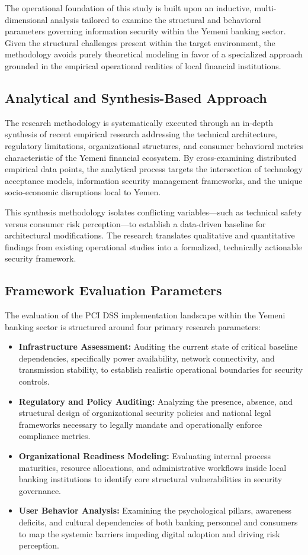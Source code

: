 \documentclass[12pt,a4paper,oneside]{report}
\begin{document}
	The operational foundation of this study is built upon an inductive, multi-dimensional analysis tailored to examine the structural and behavioral parameters governing information security within the Yemeni banking sector. Given the structural challenges present within the target environment, the methodology avoids purely theoretical modeling in favor of a specialized approach grounded in the empirical operational realities of local financial institutions.
	
	\subsection{Analytical and Synthesis-Based Approach}
	The research methodology is systematically executed through an in-depth synthesis of recent empirical research addressing the technical architecture, regulatory limitations, organizational structures, and consumer behavioral metrics characteristic of the Yemeni financial ecosystem. By cross-examining distributed empirical data points, the analytical process targets the intersection of technology acceptance models, information security management frameworks, and the unique socio-economic disruptions local to Yemen. 
	
	This synthesis methodology isolates conflicting variables—such as technical safety versus consumer risk perception—to establish a data-driven baseline for architectural modifications. The research translates qualitative and quantitative findings from existing operational studies into a formalized, technically actionable security framework.
	
	\subsection{Framework Evaluation Parameters}
	The evaluation of the PCI DSS implementation landscape within the Yemeni banking sector is structured around four primary research parameters:
	\begin{itemize}
		\item \textbf{Infrastructure Assessment:} Auditing the current state of critical baseline dependencies, specifically power availability, network connectivity, and transmission stability, to establish realistic operational boundaries for security controls.
		\item \textbf{Regulatory and Policy Auditing:} Analyzing the presence, absence, and structural design of organizational security policies and national legal frameworks necessary to legally mandate and operationally enforce compliance metrics.
		\item \textbf{Organizational Readiness Modeling:} Evaluating internal process maturities, resource allocations, and administrative workflows inside local banking institutions to identify core structural vulnerabilities in security governance.
		\item \textbf{User Behavior Analysis:} Examining the psychological pillars, awareness deficits, and cultural dependencies of both banking personnel and consumers to map the systemic barriers impeding digital adoption and driving risk perception.
	\end{itemize}
	
\end{document}
